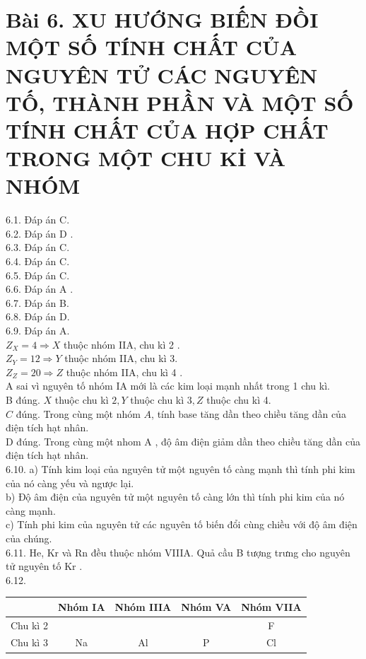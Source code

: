 \documentclass[10pt]{article}
\begin{document}
\section*{Bài 6. XU HƯỚNG BIẾN ĐỒI MỘT SỐ TÍNH CHẤT CỦA NGUYÊN TỬ CÁC NGUYÊN TỐ, THÀNH PHẦN VÀ MỘT SỐ TÍNH CHẤT CỦA HỢP CHẤT TRONG MỘT CHU Kİ VÀ NHÓM}
6.1. Đáp án C.\\
6.2. Đáp án D .\\
6.3. Đáp án C.\\
6.4. Đáp án C.\\
6.5. Đáp án C.\\
6.6. Đáp án A .\\
6.7. Đáp án B.\\
6.8. Đáp án D.\\
6.9. Đáp án A.\\
$Z_{X}=4 \Rightarrow X$ thuộc nhóm IIA, chu kì 2 .\\
$Z_{Y}=12 \Rightarrow Y$ thuộc nhóm IIA, chu kì 3.\\
$Z_{Z}=20 \Rightarrow Z$ thuộc nhóm IIA, chu kì 4 .\\
A sai vì nguyên tố nhóm IA mới là các kim loại mạnh nhất trong 1 chu kì.\\
B đúng. $X$ thuộc chu kì $2, Y$ thuộc chu kì $3, Z$ thuộc chu kì 4.\\
$C$ đúng. Trong cùng một nhóm $A$, tính base tăng dần theo chiều tăng dần của điện tích hạt nhân.\\
D đúng. Trong cùng một nhom A , độ âm điện giảm dần theo chiều tăng dần của điện tích hạt nhân.\\
6.10. a) Tính kim loại của nguyên tử một nguyên tố càng mạnh thì tính phi kim của nó càng yếu và ngược lại.\\
b) Độ âm điện của nguyên tử một nguyên tố càng lớn thì tính phi kim của nó càng mạnh.\\
c) Tính phi kim của nguyên tử các nguyên tố biến đổi cùng chiều với độ âm điện của chúng.\\
6.11. He, Kr và Rn đều thuộc nhóm VIIIA. Quả cầu B tượng trưng cho nguyên tử nguyên tố Kr .\\
6.12.

\begin{center}
\begin{tabular}{|c|c|c|c|c|}
\hline
 & Nhóm IA & Nhóm IIIA & Nhóm VA & Nhóm VIIA \\
\hline
Chu kì 2 &  &  &  & F \\
\hline
Chu kì 3 & Na & Al & P & Cl \\
\hline
\end{tabular}
\end{center}
\end{document}
